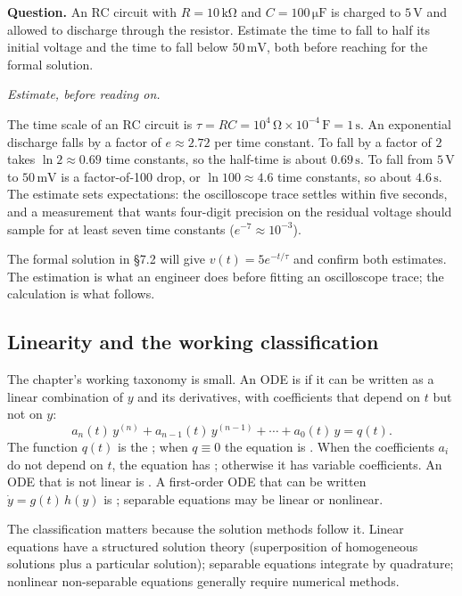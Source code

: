 \begin{estimation}
\textbf{Question.} An RC circuit with $R = 10\,\si{\kilo\ohm}$ and
$C = 100\,\si{\micro\farad}$ is charged to $5\,\si{\volt}$ and
allowed to discharge through the resistor. Estimate the time to
fall to half its initial voltage and the time to fall below
$50\,\si{\milli\volt}$, both before reaching for the formal
solution.

\smallskip
\textit{Estimate, before reading on.}

\smallskip
The time scale of an RC circuit is $\tau = RC = 10^{4}\,\si{\ohm}
\times 10^{-4}\,\si{\farad} = 1\,\si{\second}$. An exponential
discharge falls by a factor of $e \approx 2.72$ per time constant.
To fall by a factor of $2$ takes $\ln 2 \approx 0.69$ time
constants, so the half-time is about $0.69\,\si{\second}$. To fall
from $5\,\si{\volt}$ to $50\,\si{\milli\volt}$ is a factor-of-100
drop, or $\ln 100 \approx 4.6$ time constants, so about
$4.6\,\si{\second}$. The estimate sets expectations: the
oscilloscope trace settles within five seconds, and a measurement
that wants four-digit precision on the residual voltage should
sample for at least seven time constants ($e^{-7} \approx 10^{-3}$).

The formal solution in §7.2 will give $v(t) = 5 e^{-t/\tau}$ and
confirm both estimates. The estimation is what an engineer does
before fitting an oscilloscope trace; the calculation is what
follows.
\end{estimation}

\subsection{Linearity and the working classification}

The chapter's working taxonomy is small. An ODE is 
if it can be written as a linear combination of $y$ and its
derivatives, with coefficients that depend on $t$ but not on $y$:
\[
a_{n}(t)\, y^{(n)} + a_{n-1}(t)\, y^{(n-1)} + \cdots + a_{0}(t)\, y = q(t).
\]
The function $q(t)$ is the ; when $q \equiv 0$ the
equation is . When the coefficients $a_{i}$
do not depend on $t$, the equation has ; otherwise it has variable coefficients. An ODE that
is not linear is . A first-order ODE that can be
written $\dot{y} = g(t)\, h(y)$ is ; separable
equations may be linear or nonlinear.

The classification matters because the solution methods follow it.
Linear equations have a structured solution theory (superposition of
homogeneous solutions plus a particular solution); separable
equations integrate by quadrature; nonlinear non-separable equations
generally require numerical methods.

